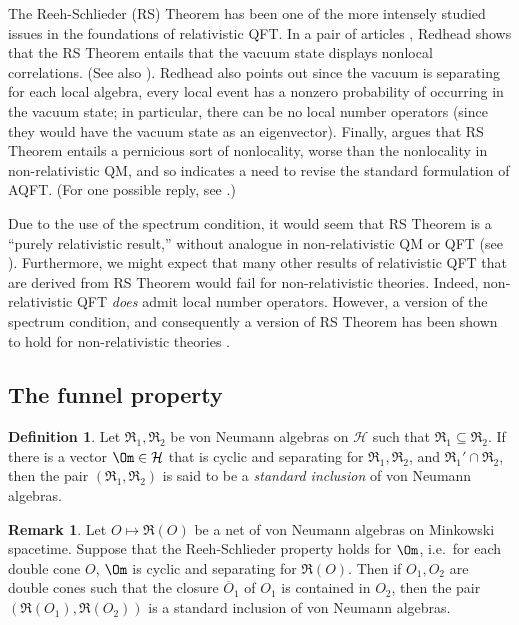 \documentclass[11pt]{article}
\newcommand{\alg}[1]{\mathfrak{#1}}
\theoremstyle{definition}
\theoremstyle{definition}
\newtheorem{defn}[thm]{Definition}
\newtheorem{note}[thm]{Remark}
\theoremstyle{remark}
\def\2#1{{\mathcal #1}}
\def\ol#1{{\overline #1}}
\def\al#1{{\mathfrak #1}}
\begin{document}
The Reeh-Schlieder (RS) Theorem has been one of the
more intensely studied issues in the foundations of
relativistic QFT.  In a pair of articles
\cite{red1,red2}, Redhead shows that the RS Theorem entails
that the vacuum state displays nonlocal
correlations. (See also \cite{gbell}).  Redhead also
points out since the vacuum is separating for each
local algebra, every local event has a nonzero
probability of occurring in the vacuum state; in
particular, there can be no local number operators
(since they would have the vacuum state as an
eigenvector).  Finally, \cite{flem} argues that RS Theorem
entails a pernicious sort of nonlocality, worse than
the nonlocality in non-relativistic QM, and so
indicates a need to revise the standard formulation of
AQFT.  (For one possible reply, see \cite{me}.)

Due to the use of the spectrum condition, it would seem
that RS Theorem is a ``purely relativistic result,''
without analogue in non-relativistic QM or QFT (see
\cite{saund}).  Furthermore, we might expect that many
other results of relativistic QFT that are derived from
RS Theorem would fail for non-relativistic theories.
Indeed, non-relativistic QFT \emph{does} admit local
number operators.  However, a version of the spectrum
condition, and consequently a version of RS Theorem has
been shown to hold for non-relativistic theories
\cite{req}.

\bigskip {}

\subsection{The funnel property}

\begin{defn} Let $\al R_1,\al R_2$ be von Neumann
  algebras on $\2H$ such that $\al R_1\subseteq \al
  R_2$.  If there is a vector $\Om \in \2H$ that is
  cyclic and separating for $\al R_1,\al R_2$, and $\al
  R_1'\cap \al R_2$, then the pair $(\al R_1,\al R_2)$
  is said to be a \emph{standard inclusion} of von
  Neumann algebras.  \end{defn}

\begin{note} Let $O\mapsto \al R(O)$ be a net of von
  Neumann algebras on Minkowski spacetime.  Suppose
  that the Reeh-Schlieder property holds for $\Om$,
  i.e.\ for each double cone $O$, $\Om$ is cyclic and
  separating for $\al R(O)$.  Then if $O_1,O_2$ are
  double cones such that the closure $\ol{O}_1$ of
  $O_1$ is contained in $O_2$, then the pair
  $(\alg{R}(O_1),\alg{R}(O_2))$ is a standard inclusion
  of von Neumann algebras.  \end{note}
\end{document}
